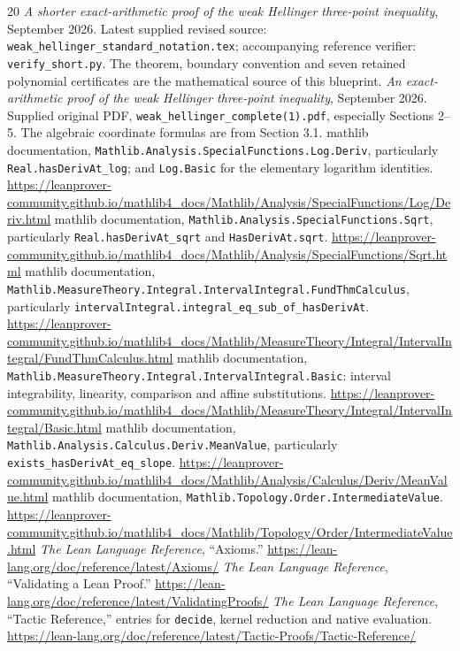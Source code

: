\documentclass[11pt,a4paper]{article}
\theoremstyle{definition}
\newcommand{\lean}[1]{{\small\nolinkurl{#1}}}
\begin{document}
\begin{thebibliography}{20}
\emph{A shorter exact-arithmetic proof of the weak Hellinger three-point inequality}, September 2026. Latest supplied revised source: \texttt{weak\_hellinger\_standard\_notation.tex}; accompanying reference verifier: \texttt{verify\_short.py}. The theorem, boundary convention and seven retained polynomial certificates are the mathematical source of this blueprint.
\emph{An exact-arithmetic proof of the weak Hellinger three-point inequality}, September 2026. Supplied original PDF, \texttt{weak\_hellinger\_complete(1).pdf}, especially Sections 2--5. The algebraic coordinate formulas are from Section 3.1.
mathlib documentation, \lean{Mathlib.Analysis.SpecialFunctions.Log.Deriv}, particularly \lean{Real.hasDerivAt_log}; and \texttt{Log.Basic} for the elementary logarithm identities.
\url{https://leanprover-community.github.io/mathlib4_docs/Mathlib/Analysis/SpecialFunctions/Log/Deriv.html}
mathlib documentation, \lean{Mathlib.Analysis.SpecialFunctions.Sqrt}, particularly \lean{Real.hasDerivAt_sqrt} and \texttt{HasDerivAt.sqrt}.
\url{https://leanprover-community.github.io/mathlib4_docs/Mathlib/Analysis/SpecialFunctions/Sqrt.html}
mathlib documentation, \lean{Mathlib.MeasureTheory.Integral.IntervalIntegral.FundThmCalculus}, particularly \lean{intervalIntegral.integral_eq_sub_of_hasDerivAt}.
\url{https://leanprover-community.github.io/mathlib4_docs/Mathlib/MeasureTheory/Integral/IntervalIntegral/FundThmCalculus.html}
mathlib documentation, \lean{Mathlib.MeasureTheory.Integral.IntervalIntegral.Basic}: interval integrability, linearity, comparison and affine substitutions.
\url{https://leanprover-community.github.io/mathlib4_docs/Mathlib/MeasureTheory/Integral/IntervalIntegral/Basic.html}
mathlib documentation, \lean{Mathlib.Analysis.Calculus.Deriv.MeanValue}, particularly \lean{exists_hasDerivAt_eq_slope}.
\url{https://leanprover-community.github.io/mathlib4_docs/Mathlib/Analysis/Calculus/Deriv/MeanValue.html}
mathlib documentation, \lean{Mathlib.Topology.Order.IntermediateValue}.
\url{https://leanprover-community.github.io/mathlib4_docs/Mathlib/Topology/Order/IntermediateValue.html}
\emph{The Lean Language Reference}, ``Axioms.''
\url{https://lean-lang.org/doc/reference/latest/Axioms/}
\emph{The Lean Language Reference}, ``Validating a Lean Proof.''
\url{https://lean-lang.org/doc/reference/latest/ValidatingProofs/}
\emph{The Lean Language Reference}, ``Tactic Reference,'' entries for \texttt{decide}, kernel reduction and native evaluation.
\url{https://lean-lang.org/doc/reference/latest/Tactic-Proofs/Tactic-Reference/}
\end{thebibliography}
\end{document}
